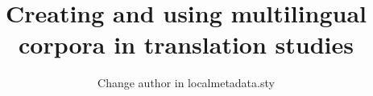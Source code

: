 

\title{Creating and using multilingual corpora in translation studies}  %
\subtitle{}
\dedication{Change dedication in localmetadata.sty}
\author{Change author in localmetadata.sty}
\renewcommand{\lsISBN}{978-3-000000-00-0}                     
\renewcommand{\lsSeries}{dummyseries} %
\renewcommand{\lsSeriesNumber}{99} %
\renewcommand{\lsURL}{http://langsci-press.org/catalog/book/0} %
